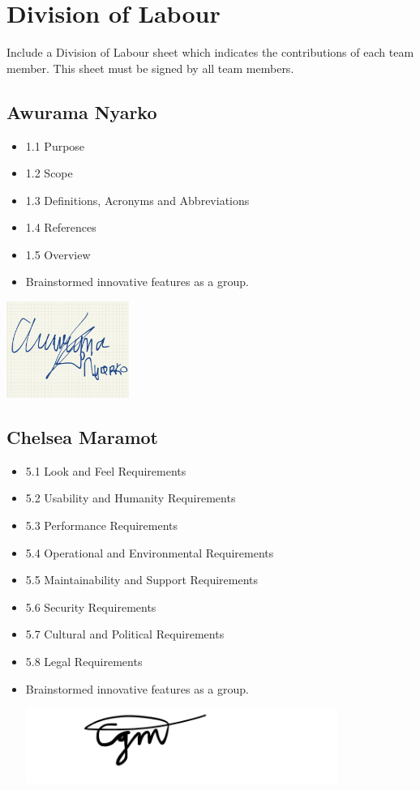 \documentclass[]{article}
\begin{document}

\appendix
\section{Division of Labour}
\label{sec:division_of_labour}
Include a Division of Labour sheet which indicates the contributions of each team member. This sheet must be signed by all team members.
\subsection{Awurama Nyarko}
\label{subsec:awurama_nyarko}
\begin{itemize}
	\item 1.1 Purpose
	\item 1.2 Scope
	\item 1.3 Definitions, Acronyms and Abbreviations
	\item 1.4 References
	\item 1.5 Overview
	\item Brainstormed innovative features as a group.
\end{itemize}
\includegraphics[width=0.3\textwidth]{awurama signature .jpg}

\subsection{Chelsea Maramot}
\label{subsec:chelsea_maramot}
\begin{itemize}
	\item 5.1 Look and Feel Requirements
	\item 5.2 Usability and Humanity Requirements
	\item 5.3 Performance Requirements
	\item 5.4 Operational and Environmental Requirements
	\item 5.5 Maintainability and Support Requirements
	\item 5.6 Security Requirements
	\item 5.7 Cultural and Political Requirements
	\item 5.8 Legal Requirements
	\item Brainstormed innovative features as a group.

	      \includegraphics[width=0.8\textwidth]{chelsea.png}
\end{itemize}
\end{document}
